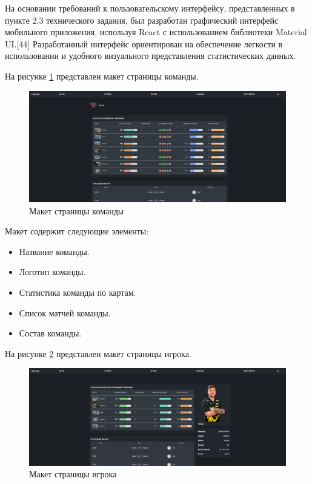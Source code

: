 На основании требований к пользовательскому интерфейсу, представленных в пункте 2.3 технического задания, был разработан графический интерфейс мобильного приложения, используя React с использованием библиотеки Material UI.[44] Разработанный интерфейс ориентирован на обеспечение легкости в использовании и удобного визуального представления статистических данных.

На рисунке \ref{fig:-teamPage} представлен макет страницы команды.
\begin{figure}
	\centering
	\includegraphics[width=0.95\linewidth]{"images/Страница команды"}
	\caption{Макет страницы команды}
	\label{fig:-teamPage}
\end{figure}

Макет содержит следующие элементы:
\begin{itemize}
	\item Название команды.
	\item Логотип команды.
	\item Статистика команды по картам.
	\item Список матчей команды.
	\item Состав команды.
\end{itemize}

На рисунке \ref{fig:-playerPage} представлен макет страницы игрока.
\begin{figure}
	\centering
	\includegraphics[width=0.95\linewidth]{"images/Страница игрока"}
	\caption{Макет страницы игрока}
	\label{fig:-playerPage}
\end{figure}


